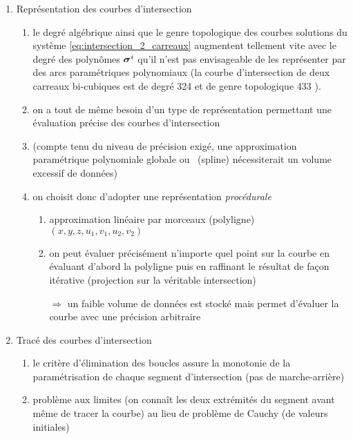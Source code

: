 \begin{enumerate}
	\item Représentation des courbes d'intersection
	\begin{enumerate}
		\item le degré algébrique ainsi que le genre topologique des courbes solutions du système \eqref{eq:intersection_2_carreaux} augmentent tellement vite avec le degré des polynômes $\bm{\sigma}^i$ qu'il n'est pas envisageable de les représenter par des arcs paramétriques polynomiaux (\eg la courbe d'intersection de deux carreaux bi-cubiques est de degré 324 et de genre topologique 433 \cite{katz1988}).
		\item on a tout de même besoin d'un type de représentation permettant une évaluation précise des courbes d'intersection
		\item (compte tenu du niveau de précision exigé, une approximation paramétrique polynomiale globale ou \piecewise\ (spline) nécessiterait un volume excessif de données)
		\item on choisit donc d'adopter une représentation \textit{procédurale}
		\begin{enumerate}
			\item approximation linéaire par morceaux (polyligne) $(x,y,z,u_1,v_1,u_2,v_2)$
			\item on peut évaluer précisément n'importe quel point sur la courbe en évaluant d'abord la polyligne puis en raffinant le résultat de façon itérative (projection sur la véritable intersection)
			\item[$\Rightarrow$] un faible volume de données est stocké mais permet d'évaluer la courbe avec une précision arbitraire
		\end{enumerate}
	\end{enumerate}
	
	
	\item Tracé des courbes d'intersection
	\begin{enumerate}
		\item le critère d'élimination des boucles assure la monotonie de la paramétrisation de chaque segment d'intersection (pas de marche-arrière)
		\item problème aux limites (on connaît les deux extrémités du segment avant même de tracer la courbe) au lieu de problème de Cauchy (de valeurs initiales)
	\end{enumerate}
\end{enumerate}


\par\bigskip


